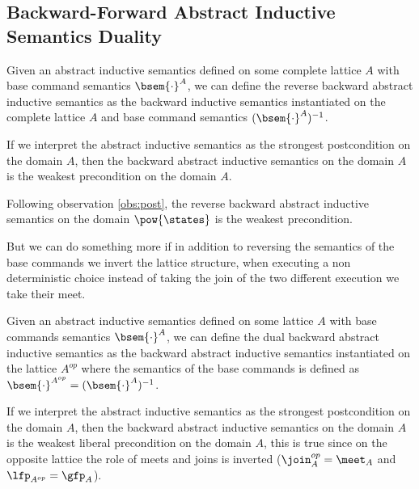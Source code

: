 \subsection{Backward-Forward Abstract Inductive Semantics Duality}

\begin{definition}
  Given an abstract inductive semantics defined on some complete lattice $A$ 
  with base command semantics $\bsem{\cdot}^A$, we can define the reverse
  backward abstract inductive semantics as the backward inductive semantics
  instantiated on the complete lattice $A$ and base command semantics 
  $(\bsem{\cdot}^A)^{-1}$.
\end{definition}

If we interpret the abstract inductive semantics as the strongest postcondition
on the domain $A$, then the backward abstract inductive semantics on the domain 
$A$ is the weakest precondition on the domain $A$.

\begin{observation}
  \label{obs:weakest-precondition}
  Following observation \ref{obs:post}, the reverse backward 
  abstract inductive semantics on the domain $\pow{\states}$ is the weakest 
  precondition.
\end{observation}

But we can do something more if in addition to reversing the semantics of the 
base commands we invert the lattice structure, when executing a non 
deterministic choice instead of taking the join of the two different execution
we take their meet.

\begin{definition}
  Given an abstract inductive semantics defined on some lattice $A$ with
  base commands semantics $\bsem{\cdot}^A$, we can define the dual backward 
  abstract inductive semantics as the backward abstract inductive semantics
  instantiated on the lattice $A^{op}$ where the semantics of the
  base commands is defined as $\bsem{\cdot}^{A^{op}} = (\bsem{\cdot}^A)^{-1}$.
\end{definition}

If we interpret the abstract inductive semantics as the strongest postcondition
on the domain $A$, then the backward abstract inductive semantics on the domain 
$A$ is the weakest liberal precondition on the domain $A$, this is true since on 
the opposite lattice the role of meets and joins is inverted ($\join_A^{op} = 
\meet_A$ and $\lfp_{A^{op}} = \gfp_A$).

